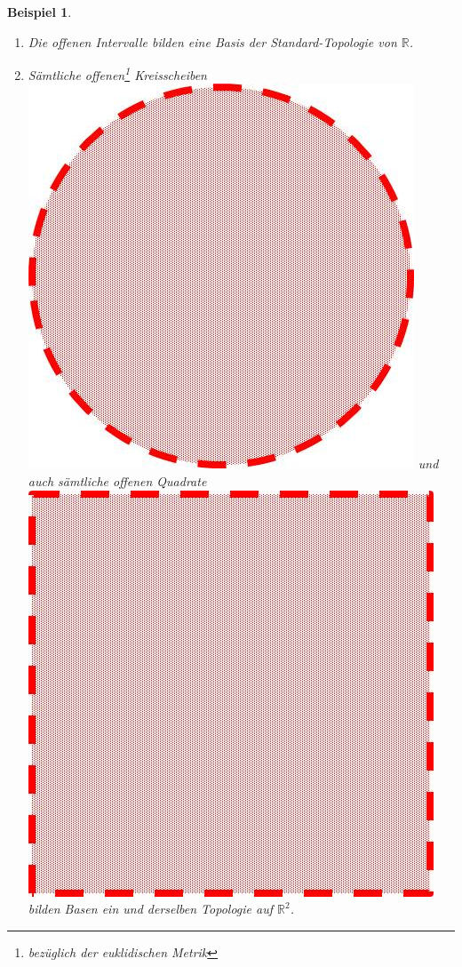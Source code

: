 \documentclass[a4paper,11pt,notitlepage]{report}
\newtheorem{example}{Beispiel}[chapter]
\newcommand{\R}{{\ensuremath{\mathbb{R}}}}
\begin{document}
\begin{example}
	\begin{enumerate}[(1)]
		\item Die offenen Intervalle bilden eine Basis der Standard-Topologie von $\R$.
		\item Sämtliche offenen\footnote{bezüglich der euklidischen Metrik} Kreisscheiben \includegraphics[scale=0.07]{images/offener_Kreis.jpg} und auch sämtliche offenen Quadrate \includegraphics[scale=0.07]{images/offenes_Quadrat.jpg} bilden Basen ein und derselben Topologie auf $\R^2$.
	\end{enumerate}
\end{example}
\end{document}
